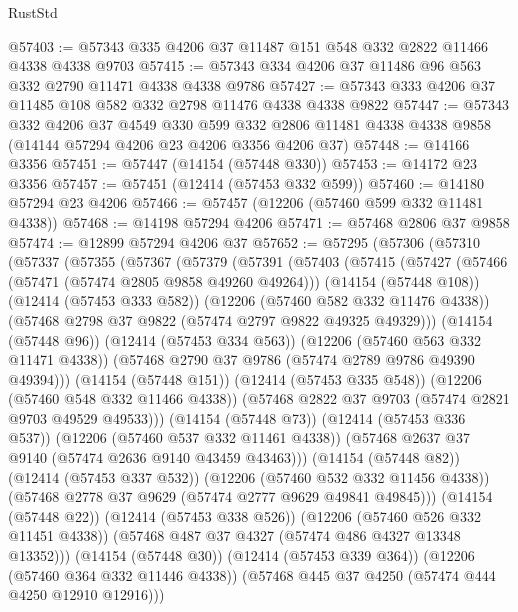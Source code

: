 \begin{lexlean}{RustStd}
\begin{coremodule}
{\begin{coremodule}
{{{{{{{{{{{{{{{{{{{{{{{{{{{{{{{{{{{{{{{{{{{{{{{{{{@57403 := @57343 @335 @4206 @37 @11487 @151 @548 @332 @2822 @11466 @4338 @4338 @9703
@57415 := @57343 @334 @4206 @37 @11486 @96 @563 @332 @2790 @11471 @4338 @4338 @9786
@57427 := @57343 @333 @4206 @37 @11485 @108 @582 @332 @2798 @11476 @4338 @4338 @9822
@57447 := @57343
    @332
    @4206
    @37
    @4549
    @330
    @599
    @332
    @2806
    @11481
    @4338
    @4338
    @9858
    (@14144 @57294 @4206 @23 @4206 @3356 @4206 @37)
@57448 := @14166 @3356
@57451 := @57447 (@14154 (@57448 @330))
@57453 := @14172 @23 @3356
@57457 := @57451 (@12414 (@57453 @332 @599))
@57460 := @14180 @57294 @23 @4206
@57466 := @57457 (@12206 (@57460 @599 @332 @11481 @4338))
@57468 := @14198 @57294 @4206
@57471 := @57468 @2806 @37 @9858
@57474 := @12899 @57294 @4206 @37
@57652 := @57295
    (@57306
      (@57310
        (@57337
          (@57355
            (@57367
              (@57379
                (@57391
                  (@57403
                    (@57415
                      (@57427
                        (@57466 (@57471 (@57474 @2805 @9858 @49260 @49264)))
                        (@14154 (@57448 @108))
                        (@12414 (@57453 @333 @582))
                        (@12206 (@57460 @582 @332 @11476 @4338))
                        (@57468 @2798 @37 @9822 (@57474 @2797 @9822 @49325 @49329)))
                      (@14154 (@57448 @96))
                      (@12414 (@57453 @334 @563))
                      (@12206 (@57460 @563 @332 @11471 @4338))
                      (@57468 @2790 @37 @9786 (@57474 @2789 @9786 @49390 @49394)))
                    (@14154 (@57448 @151))
                    (@12414 (@57453 @335 @548))
                    (@12206 (@57460 @548 @332 @11466 @4338))
                    (@57468 @2822 @37 @9703 (@57474 @2821 @9703 @49529 @49533)))
                  (@14154 (@57448 @73))
                  (@12414 (@57453 @336 @537))
                  (@12206 (@57460 @537 @332 @11461 @4338))
                  (@57468 @2637 @37 @9140 (@57474 @2636 @9140 @43459 @43463)))
                (@14154 (@57448 @82))
                (@12414 (@57453 @337 @532))
                (@12206 (@57460 @532 @332 @11456 @4338))
                (@57468 @2778 @37 @9629 (@57474 @2777 @9629 @49841 @49845)))
              (@14154 (@57448 @22))
              (@12414 (@57453 @338 @526))
              (@12206 (@57460 @526 @332 @11451 @4338))
              (@57468 @487 @37 @4327 (@57474 @486 @4327 @13348 @13352)))
            (@14154 (@57448 @30))
            (@12414 (@57453 @339 @364))
            (@12206 (@57460 @364 @332 @11446 @4338))
            (@57468 @445 @37 @4250 (@57474 @444 @4250 @12910 @12916)))
}}}}}}}}}}}}}}}}}}}}}}}}}}}}}}}}}}}}}}}}}}}}}}}}}}
\end{coremodule}}
\end{coremodule}
\end{lexlean}
